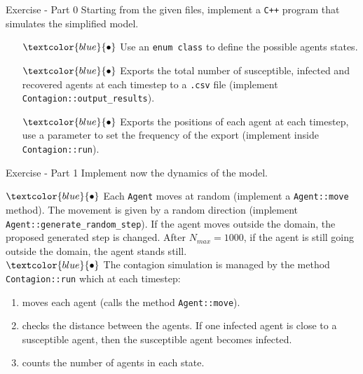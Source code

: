 \documentclass[10pt,aspectratio=169]{beamer}
\begin{document}
\begin{frame}{Exercise - Part 0}
	Starting from the given files, implement a \texttt{C++} program that simulates the simplified model. \\
    \begin{itemize}
  		\item[$\textcolor{blue}{\bullet}$] Use an \texttt{enum class} to define the possible agents states.
        \item[$\textcolor{blue}{\bullet}$] Exports the total number of susceptible, infected and recovered agents at each timestep to a \texttt{.csv} file (implement \texttt{Contagion::output\_results}).
        \item[$\textcolor{blue}{\bullet}$] Exports the positions of each agent at each timestep, use a parameter to set the frequency of the export (implement inside \texttt{Contagion::run}).
    \end{itemize}
    
\end{frame}
\begin{frame}{ Exercise - Part 1}  
	Implement now the dynamics of the model.

$\textcolor{blue}{\bullet}$ Each \texttt{Agent} moves at random (implement a \texttt{Agent::move} method). The movement is given by a random direction (implement \texttt{Agent::generate\_random\_step}). If the agent moves outside the domain, the proposed generated step is changed. After $N_{max} = 1000$, if the agent is still going outside the domain, the agent stands still.  \\
\medskip 
$\textcolor{blue}{\bullet}$ The contagion simulation is managed by the method \texttt{Contagion::run} which at each timestep:
        \begin{enumerate}
            \item moves each agent (calls the method \texttt{Agent::move}).
            \item checks the distance between the agents. If one infected agent is close to a susceptible agent, then the susceptible agent becomes infected.
            \item counts the number of agents in each state.
        \end{enumerate}

\end{frame}
\end{document}
